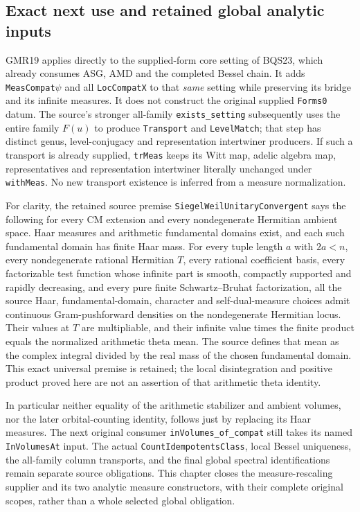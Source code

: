 \subsection{Exact next use and retained global analytic inputs}

GMR19 applies directly to the supplied-form core setting of BQS23,
which already consumes ASG, AMD and the completed Bessel chain.
It adds \texttt{MeasCompat\ensuremath{\psi}} and all \texttt{LocCompatX} to
that \emph{same} setting while preserving its bridge and its
infinite measures.  It does not construct the original supplied
\texttt{Forms0} datum.  The source's stronger all-family
\texttt{exists\_setting} subsequently uses the entire family
$F(u)$ to produce \texttt{Transport} and \texttt{LevelMatch};
that step has distinct genus, level-conjugacy and representation
intertwiner producers.  If such a transport is already supplied,
\texttt{trMeas} keeps its Witt map, adelic algebra map, representatives
and representation intertwiner literally unchanged under
\texttt{withMeas}.  No new transport existence is inferred from a
measure normalization.

For clarity, the retained source premise
\texttt{SiegelWeilUnitaryConvergent} says the following for every CM
extension and every nondegenerate Hermitian ambient space.  Haar
measures and arithmetic fundamental domains exist, and each such
fundamental domain has finite Haar mass.  For every tuple length
$a$ with $2a<n$, every nondegenerate rational Hermitian $T$, every
rational coefficient basis, every factorizable test function whose
infinite part is smooth, compactly supported and rapidly decreasing,
and every pure finite Schwartz--Bruhat factorization, all the source
Haar, fundamental-domain, character and self-dual-measure choices
admit continuous Gram-pushforward densities on the nondegenerate
Hermitian locus.  Their values at $T$ are multipliable, and their
infinite value times the finite product equals the normalized
arithmetic theta mean.  The source defines that mean as the complex
integral divided by the real mass of the chosen fundamental domain.
This exact universal premise is retained; the local disintegration
and positive product proved here are not an assertion of that
arithmetic theta identity.

In particular neither equality of the arithmetic stabilizer and
ambient volumes, nor the later orbital-counting identity, follows
just by replacing its Haar measures.  The next original consumer
\texttt{inVolumes\_of\_compat} still takes its named
\texttt{InVolumesAt} input.  The actual
\texttt{CountIdempotentsClass}, local Bessel uniqueness, the
all-family column transports, and the final global spectral
identifications remain separate source obligations.  This chapter
closes the measure-rescaling supplier and its two analytic measure
constructors, with their complete original scopes, rather than a
whole selected global obligation.
